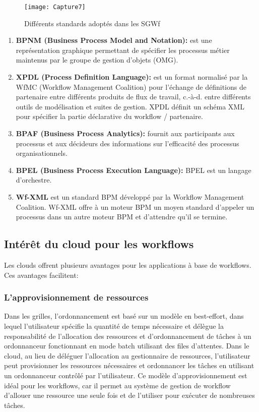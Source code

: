 \begin{figure}[!h]
	\centering
	\texttt{[image: Capture7]}
	\caption{Différents standards adoptés dans les SGWf}
	\label{fig:capture7}
\end{figure}


\begin{enumerate}
\item \textbf{ BPNM (Business Process Model and Notation):} est une représentation graphique permettant de spécifier les processus métier maintenus par le groupe de gestion d'objets (OMG). 
\item \textbf{XPDL (Process Definition Language):} est un format normalisé par la WfMC (Workflow Management Coalition) pour l’échange de définitions de partenaire entre différents produits de flux de travail, c.-à-d. entre différents outils de modélisation et suites de gestion. XPDL définit un schéma XML pour spécifier la partie déclarative du workflow / partenaire.
\item \textbf{BPAF (Business Process Analytics):} fournit aux participants aux processus et aux décideurs des informations sur l'efficacité des processus organisationnels.
\item \textbf{BPEL (Business Process Execution Language):} BPEL est un langage d'orchestre.
\item \textbf{ Wf-XML }est un standard BPM développé par la Workflow Management Coalition. Wf-XML offre à un moteur BPM un moyen standard d'appeler un processus dans un autre moteur BPM et d'attendre qu'il se termine.
\end{enumerate}



\subsection{ Intérêt du cloud pour les workflows }
Les clouds offrent plusieurs avantages pour les applications à base de workflows. 
Ces avantages facilitent: 
\subsubsection{L’approvisionnement de ressources }
Dans les grilles, l'ordonnancement est basé sur un modèle en best-effort, dans lequel l’utilisateur spécifie la quantité de temps nécessaire et délègue la responsabilité de l'allocation des ressources et d'ordonnancement de tâches à un ordonnanceur fonctionnant en mode batch utilisant des files d’attentes. Dans le cloud, au lieu de déléguer l’allocation au gestionnaire de ressources, l'utilisateur peut provisionner les ressources nécessaires et ordonnancer les tâches en utilisant un ordonnanceur contrôlé par l'utilisateur. Ce modèle d’approvisionnement est idéal pour les workflows, car il permet au système de gestion de workflow d'allouer une ressource une seule fois et de l'utiliser pour exécuter de nombreuses tâches. 
